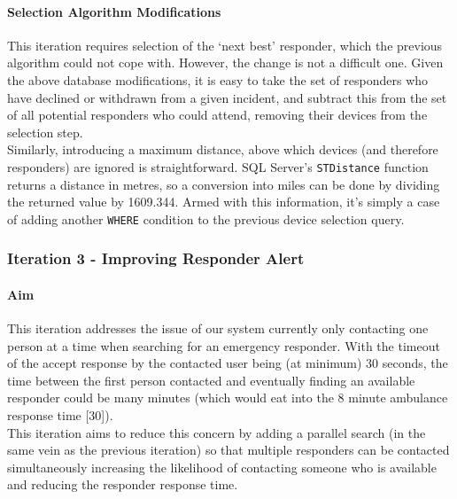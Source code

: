 \documentclass{article}
\begin{document}
\paragraph{Selection Algorithm Modifications}
This iteration requires selection of the ‘next best’ responder, which the previous algorithm could not cope with. However, the change is not a difficult one. Given the above database modifications, it is easy to take the set of responders who have declined or withdrawn from a given incident, and subtract this from the set of all potential responders who could attend, removing their devices from the selection step.\\

Similarly, introducing a maximum distance, above which devices (and therefore responders) are ignored is straightforward. SQL Server’s \texttt{\color{OliveGreen}STDistance} function returns a distance in metres, so a conversion into miles can be done by dividing the returned value by 1609.344. Armed with this information, it’s simply a case of adding another \texttt{\color{OliveGreen}WHERE} condition to the previous device selection query.\\



\pagebreak
		\subsubsection{Iteration 3 - Improving Responder Alert}
		\paragraph{Aim}
This iteration addresses the issue of our system currently only contacting one person at a time when searching for an emergency responder. With the timeout of the accept response by the contacted user being (at minimum) 30 seconds, the time between the first person contacted and eventually finding an available responder could be many minutes (which would eat into the 8 minute ambulance response time [30]).\\

This iteration aims to reduce this concern by adding a parallel search (in the same vein as the previous iteration) so that multiple responders can be contacted simultaneously increasing the likelihood of contacting someone who is available and reducing the responder response time.\\
\end{document}
